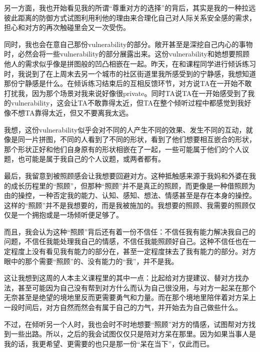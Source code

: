 \tristarsepline

另一方面，我也开始看见我的所谓“尊重对方的选择”的背后，其实是我的一种拉远彼此距离的防御方式\pozhehao{}试图利用利他的理由来合理化自己对人际关系安全感的需求，担心和对方的再次触碰里会又一次受伤。

同时，我也会在意自己那份vulnerability的部分。敞开甚至是深挖自己内心的事物时，必然会将一些vulnerability的部分展露出来。这份vulnerability和她想要照顾他人的需求似乎像是拼图般的凹凸相嵌在一起。昨天，在和课程同学进行倾诉练习时，我说到了在上周末去另一个城市的社区街道里我所感受到的宁静感，我想知道那份宁静感是什么。在倾诉练习结束后的互相反馈环节，对方说TA在一开始不敢打扰我，因为那个场景对我来说好像很private。同时TA说TA在一开始感受到了我的vulnerability，这会让TA不敢靠得太近，但TA在整个倾听过程中都感觉到我好像不想TA靠得太近，但又不要离我太远。

我想，这份vulnerability似乎会对不同的人产生不同的效果、发生不同的互动，就像是同一片拼图，不同的人看到了不同的形状，看到了他们想要相互嵌合的形状，那个形状正好和他们自身原有的形状相嵌在了一起，一些可能属于他们的个人议题，也可能是属于我自己的个人议题，或两者都有。

\tristarsepline

最后，我留意到被照顾感会让我想要回避对方。这种抵触感来源于我妈和外婆在我的成长历程里的“照顾”，但那种“照顾”并不是真正的照顾，而更像是一种借照顾为由的操控，一种否定我的能力、认知、感知、想法、情感甚至是存在本身的操控。这样的“照顾”并不是我想要的，而是我被施加的。我想要的照顾、我需要的照顾仅仅是一个拥抱或是一场倾听便足够了。

而且，我会认为这种“照顾”背后还有着一份不信任：不信任我有能力解决我自己的问题，不信任我能处理我自己的情感，不信任我能照顾好自己。这种不信任也在一定程度上没有看见我有能力的部分在，甚至一定程度抹去了我有能力的部分。对方眼中的那个需要“照顾”的、没有能力的“我”，并不是我。

这让我想到这周的人本主义课程里的其中一点：比起给对方提建议、替对方找办法，甚至可能因为自己没有帮到对方什么而认为自己很没用，与对方一起呆在那个无奈甚至是绝望的境地里反而更需要勇气和力量。而在那个境地里陪伴着对方呆上一段时间后，对方自然而然会有属于自己的力气，并开始去为自己做些什么。

不过，在倾听另一个人时，我也会时不时地想要“照顾”对方的情感，试图帮对方找到一些出路。所以，之后的我会试图仅仅只是陪对方呆在那里。因为如果当事人是我的话，我更希望、更需要的也只是那一份“呆在当下”，仅此而已。

